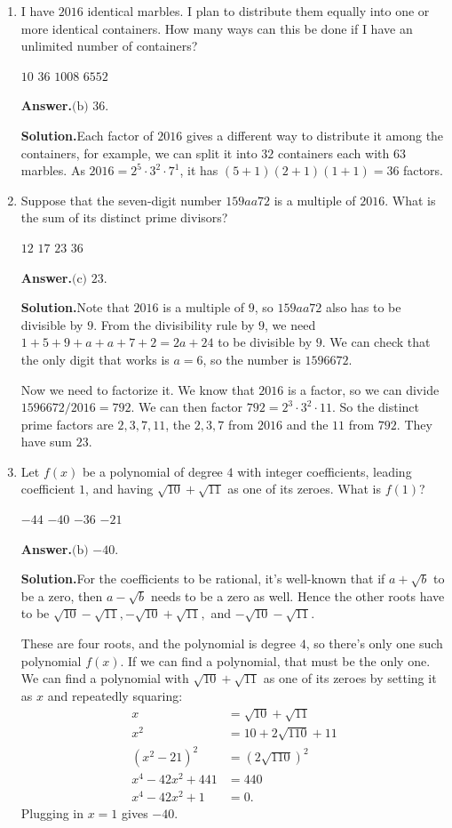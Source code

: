 \documentclass[11pt,paper=letter]{scrartcl}
\newcommand{\ans}{{\sffamily \bfseries Answer.}\;}
\newcommand{\ansb}[2]{\ans\(\boxed{\text{(#1) #2}}\).}
\newcommand{\sol}{{\sffamily \bfseries Solution.}\;}
\begin{document}
\begin{enumerate}[left=0pt]

\item I have $2016$ identical marbles. I plan to distribute them equally into one or more identical containers. How many ways can this be done if I have an unlimited number of containers?

\fourch
{$10$}
{$36$}
{$1008$}
{$6552$}

\ansb{b}{$36$}

\sol Each factor of $2016$ gives a different way to distribute it among the containers, for example, we can split it into $32$ containers each with $63$ marbles. As $2016 = 2^5 \cdot 3^2 \cdot 7^1$, it has $(5 + 1)(2 + 1)(1 + 1) = 36$ factors.

\item Suppose that the seven-digit number $159aa72$ is a multiple of $2016$. What is the sum of its distinct prime divisors?

\fourch
{$12$}
{$17$}
{$23$}
{$36$}

\ansb{c}{$23$}

\sol Note that $2016$ is a multiple of $9$, so $159aa72$ also has to be divisible by $9$. From the divisibility rule by $9$, we need $1 + 5 + 9 + a + a + 7 + 2 = 2a + 24$ to be divisible by $9$. We can check that the only digit that works is $a = 6$, so the number is $1596672$.

Now we need to factorize it. We know that $2016$ is a factor, so we can divide $1596672/2016 = 792$. We can then factor $792 = 2^3 \cdot 3^2 \cdot 11$. So the distinct prime factors are $2, 3, 7, 11$, the $2, 3, 7$ from $2016$ and the $11$ from $792$. They have sum $23$.

\item Let $f(x)$ be a polynomial of degree $4$ with integer coefficients, leading coefficient $1$, and having $\sqrt{10} + \sqrt{11}$ as one of its zeroes. What is $f(1)$?

\fourch
{$-44$}
{$-40$}
{$-36$}
{$-21$}

\ansb{b}{$-40$}

\sol For the coefficients to be rational, it's well-known that if $a + \sqrt{b}$ to be a zero, then $a - \sqrt{b}$ needs to be a zero as well. Hence the other roots have to be $\sqrt{10} - \sqrt{11}, -\sqrt{10} + \sqrt{11},$ and $-\sqrt{10}-\sqrt{11}$.

These are four roots, and the polynomial is degree $4$, so there's only one such polynomial $f(x)$. If we can find a polynomial, that must be the only one. We can find a polynomial with $\sqrt{10} + \sqrt{11}$ as one of its zeroes by setting it as $x$ and repeatedly squaring:
\begin{align*}
x &= \sqrt{10} + \sqrt{11} \\
x^2 &= 10 + 2\sqrt{110} + 11 \\
\left(x^2 - 21\right)^2 &= \left(2 \sqrt{110}\right)^2 \\
x^4 - 42x^2 + 441 &= 440 \\
x^4 - 42x^2 + 1 &= 0.
\end{align*}
Plugging in $x = 1$ gives $-40$.


\end{enumerate}
\end{document}

